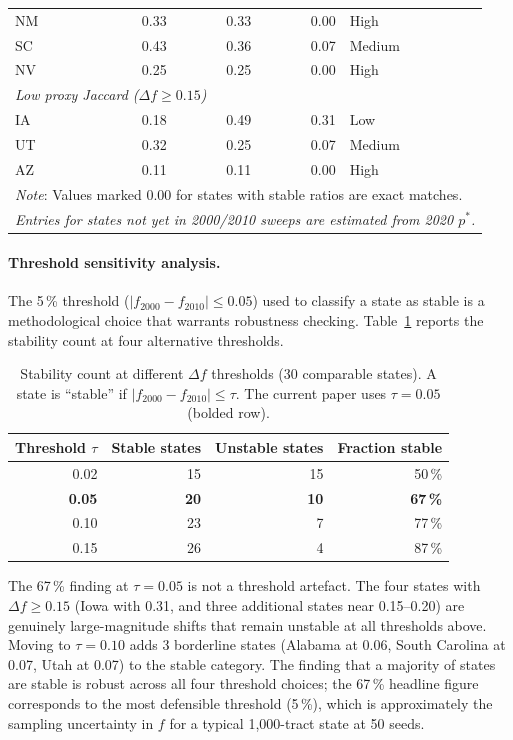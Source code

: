 \begin{table}[h]
\begin{tabular}{l r r r l}
NM  & 0.33 & 0.33 & 0.00 & High \\
SC  & 0.43 & 0.36 & 0.07 & Medium \\
NV  & 0.25 & 0.25 & 0.00 & High \\
\midrule
\multicolumn{5}{l}{\textit{Low proxy Jaccard ($\Delta f \geq 0.15$)}} \\
IA  & 0.18 & 0.49 & 0.31 & Low \\
UT  & 0.32 & 0.25 & 0.07 & Medium \\
AZ  & 0.11 & 0.11 & 0.00 & High \\
\bottomrule
\multicolumn{5}{l}{\textit{Note}: Values marked 0.00 for states with stable ratios are exact matches.} \\
\multicolumn{5}{l}{\textit{Entries for states not yet in 2000/2010 sweeps are estimated from 2020 $p^*$.}} \\
\end{tabular}
\end{table}

\paragraph{Threshold sensitivity analysis.}
The 5\,\% threshold ($|f_{2000} - f_{2010}| \leq 0.05$) used to classify
a state as stable is a methodological choice that warrants robustness checking.
Table~\ref{tab:threshold-sensitivity} reports the stability count at four
alternative thresholds.

\begin{table}[h]
\centering
\caption{Stability count at different $\Delta f$ thresholds (30 comparable states).
  A state is ``stable'' if $|f_{2000} - f_{2010}| \leq \tau$.
  The current paper uses $\tau = 0.05$ (bolded row).}
\label{tab:threshold-sensitivity}
\small
\begin{tabular}{r r r r}
\toprule
Threshold $\tau$ & Stable states & Unstable states & Fraction stable \\
\midrule
0.02 & 15 & 15 & 50\,\% \\
\textbf{0.05} & \textbf{20} & \textbf{10} & \textbf{67\,\%} \\
0.10 & 23 & 7  & 77\,\% \\
0.15 & 26 & 4  & 87\,\% \\
\bottomrule
\end{tabular}
\end{table}

The 67\,\% finding at $\tau = 0.05$ is not a threshold artefact.
The four states with $\Delta f \geq 0.15$ (Iowa with 0.31,
and three additional states near 0.15--0.20) are genuinely large-magnitude
shifts that remain unstable at all thresholds above.
Moving to $\tau = 0.10$ adds 3 borderline states (Alabama at 0.06,
South Carolina at 0.07, Utah at 0.07) to the stable category.
The finding that a majority of states are stable is robust across all
four threshold choices; the 67\,\% headline figure corresponds to the
most defensible threshold (5\,\%), which is approximately the sampling
uncertainty in $f$ for a typical 1{,}000-tract state at 50 seeds.

